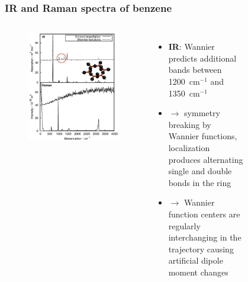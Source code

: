 \documentclass[t]{beamer}
\begin{document}
\begin{frame}
	\frametitle{IR and Raman spectra of benzene}
	\vspace{-.6cm}
	\begin{columns}
		\begin{figure}
			\vspace{-.6cm}
			\includegraphics[width=1.1\textwidth]{figures/benzene_spectra2.png}
		\end{figure}
		\begin{itemize}
			\item \textbf{IR}: Wannier predicts additional bands between 1200~cm$^{-1}$ and 1350~cm$^{-1}$
			\item[]
			      $\rightarrow$ symmetry breaking by Wannier functions, localization produces alternating single and double bonds in the ring
			\item[]
			      $\rightarrow$ Wannier function centers are regularly interchanging in the trajectory causing artificial dipole moment changes
		\end{itemize}
		\begin{figure}

\end{figure}
\end{columns}
\end{frame}
\end{document}
